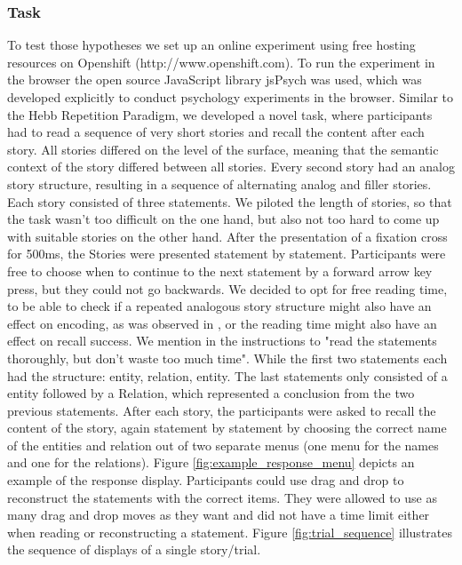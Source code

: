 \documentclass[a4paper,man,natbib,floatsintext,import]{apa6}
\begin{document}
\subsubsection{Task}
To test those hypotheses we set up an online experiment using free hosting resources on Openshift (http://www.openshift.com). To run the experiment in the browser the open source JavaScript library jsPsych \citep{DeLeeuw2015} was used, which was developed explicitly to conduct psychology experiments in the browser. Similar to the Hebb Repetition Paradigm, we developed a novel task, where participants had to read a sequence of very short stories and recall the content after each story. All stories differed on the level of the surface, meaning that the semantic context of the story differed between all stories.
Every second story had an analog story structure, resulting in a sequence of alternating analog and filler stories. Each story consisted of three statements. We piloted the length of stories, so that the task wasn't too difficult on the one hand, but also not too hard to come up with suitable stories on the other hand. After the presentation of a fixation cross for 500ms, the Stories were presented statement by statement. Participants were free to choose when to continue to the next statement by a forward arrow key press, but they could not go backwards. We decided to opt for free reading time, to be able to check if a repeated analogous story structure might also have an effect on encoding, as was observed in \cite{Day2007}, or the reading time might also have an effect on recall success. We mention in the instructions to "read the statements thoroughly, but don't waste too much time". While the first two statements each had the structure: entity, relation, entity. The last statements only consisted of a entity followed by a Relation, which represented a conclusion from the two previous statements. After each story, the participants were asked to recall the content of the story, again statement by statement by choosing the correct name of the entities and relation out of two separate menus (one menu for the names and one for the relations). Figure \ref{fig:example_response_menu} depicts an example of the response display. Participants could use drag and drop to reconstruct the statements with the correct items. They were allowed to use as many drag and drop moves as they want and did not have a time limit either when reading or reconstructing a statement. Figure \ref{fig:trial_sequence} illustrates the sequence of displays of a single story/trial.
\end{document}
